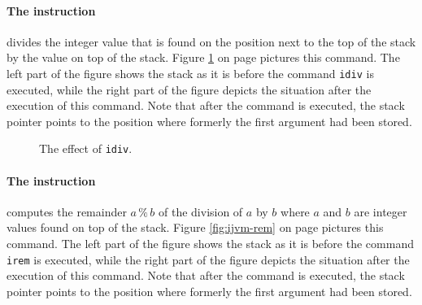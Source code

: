 \paragraph{The instruction }
divides the integer value that is found on the position next to the  top of the stack by the value
on top 
of the stack. Figure \ref{fig:ijvm-div} on page \pageref{fig:ijvm-div} pictures this command.
The left part of the figure shows the stack as it is before the command \texttt{idiv} is executed,
while the right part of the figure depicts the situation after the execution of this command.  Note
that after the command is executed, the stack pointer points to the position where formerly the
first argument had been stored.

\setlength{\unitlength}{0.5cm}
\begin{figure}[!ht]
  \centering
{}
  \caption{The effect of \texttt{idiv}.}
  \label{fig:ijvm-div}
\end{figure}

\paragraph{The instruction }
computes the remainder $a \,\texttt{\%}\, b$ of the division of $a$ by $b$ where $a$ and $b$ are
integer values found on top of the stack.
 Figure \ref{fig:ijvm-rem} on page \pageref{fig:ijvm-rem} pictures this command.
The left part of the figure shows the stack as it is before the command \texttt{irem} is executed,
while the right part of the figure depicts the situation after the execution of this command.  Note
that after the command is executed, the stack pointer points to the position where formerly the
first argument had been stored.

